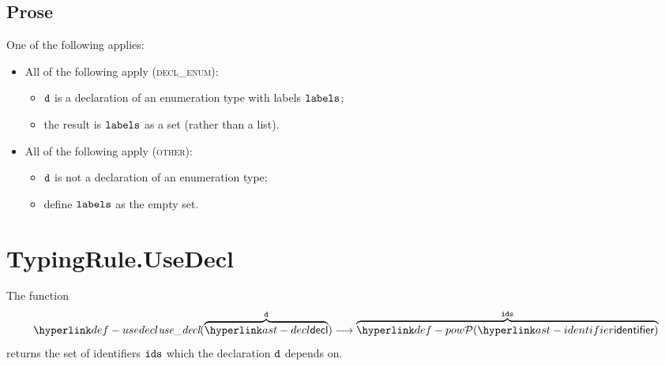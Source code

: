 \subsection{Prose}
One of the following applies:
\begin{itemize}
  \item All of the following apply (\textsc{decl\_enum}):
  \begin{itemize}
    \item $\texttt{d}$ is a declaration of an enumeration type with labels $\texttt{labels}$;
    \item the result is $\texttt{labels}$ as a set (rather than a list).
  \end{itemize}

  \item All of the following apply (\textsc{other}):
  \begin{itemize}
    \item $\texttt{d}$ is not a declaration of an enumeration type;
    \item define $\texttt{labels}$ as the empty set.
  \end{itemize}
\end{itemize}


\section{TypingRule.UseDecl \label{sec:TypingRule.UseDecl}}
\hypertarget{def-usedecl}{}
The function
\[
\usedecl(\overname{\decl}{\vd}) \aslto \overname{\pow{\identifier}}{\ids}
\]
returns the set of identifiers $\texttt{ids}$ which the declaration $\texttt{d}$ depends on.

